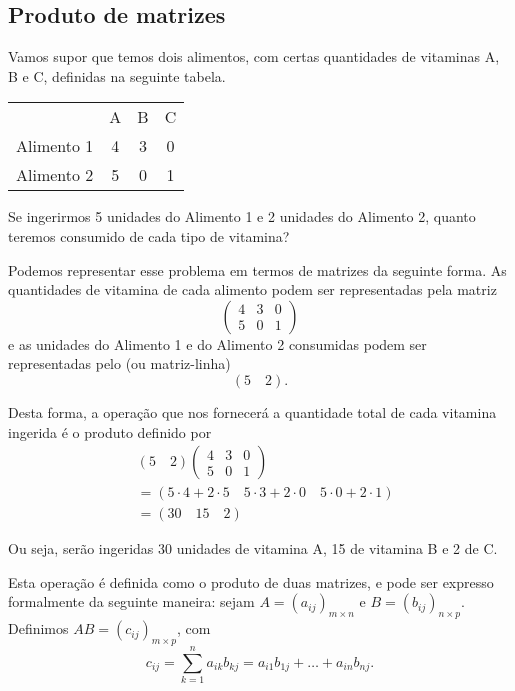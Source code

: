 \subsection{Produto de matrizes}

Vamos supor que temos dois alimentos, com certas quantidades de vitaminas A, B e C, definidas na seguinte tabela.

\begin{center}
    \begin{tabular}{l c c c}
        & A & B & C\\
        Alimento 1 & 4 & 3 & 0\\
        Alimento 2 & 5 & 0 & 1
    \end{tabular}
\end{center}

Se ingerirmos 5 unidades do Alimento 1 e 2 unidades do Alimento 2, quanto teremos consumido de cada tipo de vitamina?

Podemos representar esse problema em termos de matrizes da seguinte forma. As quantidades de vitamina de cada alimento podem ser representadas pela matriz
\begin{equation*}
    \begin{pmatrix}
        4 & 3 & 0\\
        5 & 0 & 1
    \end{pmatrix}
\end{equation*}
e as unidades do Alimento 1 e do Alimento 2 consumidas podem ser representadas pelo 
(ou matriz-linha)
\begin{equation*}
    \left( 5 \quad 2 \right).
\end{equation*}

Desta forma, a operação que nos fornecerá a quantidade total de cada vitamina ingerida é o produto definido por
\begin{align*}
    & \left( 5 \quad 2 \right)
        \begin{pmatrix}
            4 & 3 & 0\\
            5 & 0 & 1
        \end{pmatrix}\\
    &= \left( 5\cdot 4 + 2\cdot 5 \quad 5\cdot 3 + 2\cdot 0 \quad 5\cdot 0 + 2\cdot 1 \right)\\
    &= \left( 30 \quad 15 \quad 2\right)
\end{align*}

Ou seja, serão ingeridas 30 unidades de vitamina A, 15 de vitamina B e 2 de C.

Esta operação é definida como o produto de duas matrizes, e pode ser expresso formalmente da seguinte maneira: sejam $A = (a_{ij})_{m\times n}$ e $B = (b_{ij})_{n\times p}$. Definimos $AB = (c_{ij})_{m\times p}$, com
\begin{equation*}
    c_{ij} = \sum_{k = 1}^n a_{ik}b_{kj} = a_{i1}b_{1j} + \ldots + a_{in}b_{nj}.
\end{equation*}

